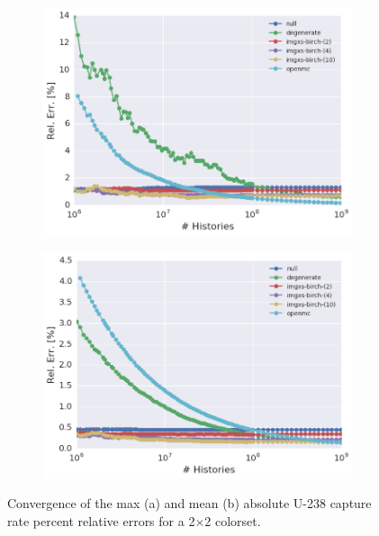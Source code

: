 \begin{figure}[h!]
\centering
\begin{subfigure}{\textwidth}
  \centering
  \includegraphics[width=0.9\linewidth]{figures/results/convergence/2x2/max-capt-err-evo}
  \caption{}
  \label{fig:chap11-2x2-capture-converge-max}
\end{subfigure}
\begin{subfigure}{\textwidth}
  \centering
  \includegraphics[width=0.9\linewidth]{figures/results/convergence/2x2/mean-capt-err-evo}
  \caption{}
  \label{fig:chap11-2x2-capture-converge-mean}
\end{subfigure}
\vspace{2mm}
\caption[Fission rate covergence for a 2$\times$2 colorset]{Convergence of the max (a) and mean (b) absolute U-238 capture rate percent relative errors for a 2$\times$2 colorset.}
\label{fig:chap11-2x2-capture-converge}
\end{figure}

